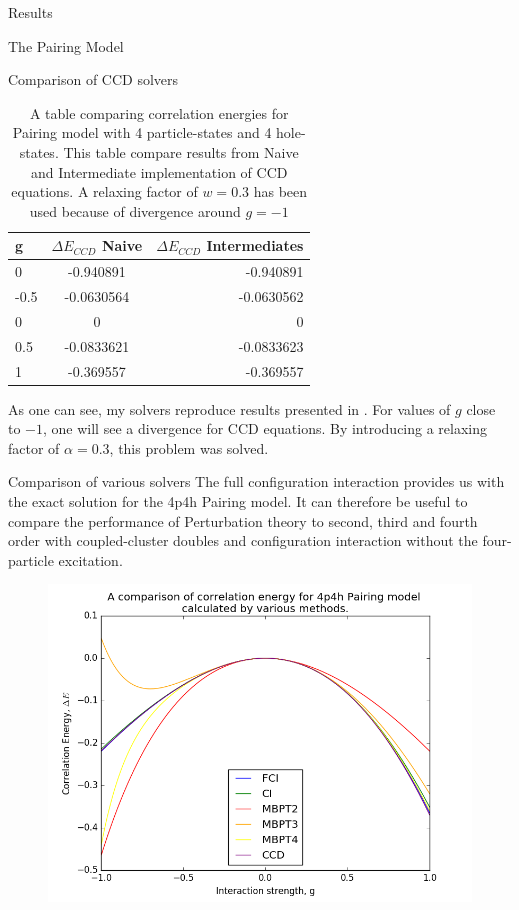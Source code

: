 \documentclass[twoside,english]{uiofysmaster}
\begin{document}
\begin{chapter}{Results}
\begin{section}{The Pairing Model}
\begin{subsection}{Comparison of CCD solvers}
			\begin{table}[H]
				\begin{center}
					\begin{tabular}[center]{l | c | r}
						g & $ \Delta E_{CCD}$ Naive  & $\Delta E_{CCD}$ Intermediates \\
						\hline
						0 & -0.940891 & -0.940891 \\
						-0.5 & -0.0630564 & -0.0630562 \\
						0 & 0 & 0 \\
						0.5 & -0.0833621 & -0.0833623 \\
						1 & -0.369557 & -0.369557
					\end{tabular}
				\end{center}
				\caption{A table comparing correlation energies for Pairing model with 4 particle-states and 4 hole-states. This table compare results from Naive and Intermediate implementation of CCD equations. A relaxing factor of $w = 0.3$ has been used because of divergence around $g=-1$}
				\label{Results3}
			\end{table}
			As one can see, my solvers reproduce results presented in \cite{Hjorth-Jensen2016}. For values of $g$ close to $-1$, one will see a divergence for CCD equations. By introducing a relaxing factor of $\alpha = 0.3$, this problem was solved. 
		\end{subsection}
		\newpage
		\begin{subsection}{Comparison of various solvers}
			The full configuration interaction provides us with the exact solution for the 4p4h Pairing model. It can therefore be useful to compare the performance of Perturbation theory to second, third and fourth order with coupled-cluster doubles and configuration interaction without the four-particle excitation. 
			\begin{figure}[]
				\includegraphics[width=\linewidth]{../Pairing_Model/Results/Figures/Pairing4p4h_CompareDE_AllMethods.png}

\end{figure}
\end{subsection}
\end{section}
\end{chapter}
\end{document}
